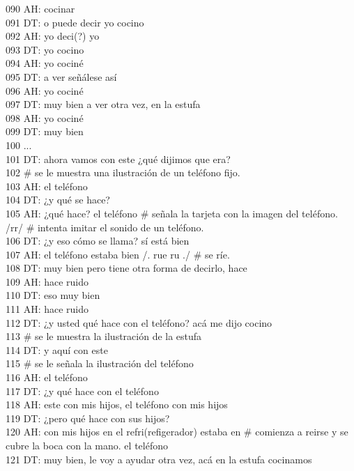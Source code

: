 090 AH: cocinar\\
091 DT: o puede decir yo cocino\\
092 AH: yo deci(?) yo\\
093 DT: yo cocino\\
094 AH: yo cociné\\
095 DT: a ver señálese así\\
096 AH: yo cociné\\
097 DT: muy bien a ver otra vez, en la estufa\\
098 AH: yo cociné \\
099 DT: muy bien\\
100 ...\\
101 DT: ahora vamos con este ¿qué dijimos que era?\\
102 \# se le muestra una ilustración de un teléfono fijo.\\
103 AH: el teléfono\\
104 DT: ¿y qué se hace?\\
105 AH: ¿qué hace? el teléfono \# señala la tarjeta con la imagen del teléfono. /rr/ \# intenta imitar el sonido de un teléfono.\\
106 DT: ¿y eso cómo se llama? sí está bien\\
107 AH: el teléfono estaba bien /. rue ru ./ \# se ríe.\\
108 DT: muy bien pero tiene otra forma de decirlo, hace\\
109 AH: hace ruido\\
110 DT: eso muy bien\\
111 AH: hace ruido \\
112 DT: ¿y usted qué hace con el teléfono? acá me dijo cocino\\
113 \# se le muestra la ilustración de la estufa\\
114 DT: y aquí con este\\
115 \# se le señala la ilustración del teléfono\\
116 AH: el teléfono\\
117 DT: ¿y qué hace con el teléfono\\
118 AH: este con mis hijos, el teléfono con mis hijos\\
119 DT: ¿pero qué hace con sus hijos?\\
120 AH: con mis hijos en el refri(refigerador) estaba en \# comienza a reirse y se cubre la boca con la mano. el teléfono\\
121 DT: muy bien, le voy a ayudar otra vez, acá en la estufa cocinamos\\
